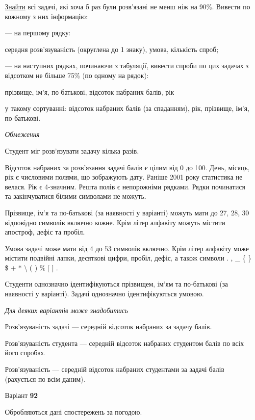 \documentclass[11pt, ukrainian]{article}
\begin{document}
\underline{Знайти} всі задачі, які хоча б раз були розв’язані не менш ніж на 90\%. Вивести по кожному з них інформацію:\par
{\noindent}--- на першому рядку:\par
середня розв’язуваність (округлена до 1 знаку), умова, кількість спроб;

{\noindent}--- на наступних рядках, починаючи з табуляції, вивести спроби по цих задачах з відсотком не більше 75\% (по одному на рядок):\par
прізвище, ім’я, по-батькові, відсоток набраних балів, рік

{\noindent}у такому сортуванні: відсоток набраних балів (за спаданням), рік, прізвище, ім’я, по-батькові.


\bigskip\textit{Обмеження}

Студент міг розв’язувати задачу кілька разів.

Відсоток набраних за розв’язання задачі балів є цілим від 0 до 100.
День, місяць, рік є числовими полями, що зображують дату.
Раніше 2001 року статистика не велася. Рік є 4-значним.
Решта полів є непорожніми рядками.
Рядки починатися та закінчуватися білими символами не можуть.

Прізвище, ім’я та по-батькові (за наявності у варіанті) можуть мати до 27, 28, 30 відповідно символів включно кожне. 
Крім літер алфавіту можуть містити апостроф, дефіс та пробіл.

Умова задачі може мати від 4 до 53 символів включно.
Крім літер алфавіту може містити подвійні лапки, десяткові цифри, пробіл, дефіс,
а також символи . , \_ \{ \} \$ $+$ $*$ {\textbackslash} ( ) \% $[$ $]$ .

Студенти однозначно ідентифікуються прізвищем, ім’ям та по-батькові (за наявності у варіанті).
Задачі однозначно ідентифікуються умовою.

\bigskip\textit{Для деяких варіантів може знадобитись}

Розв'язуваність задачі --- середній відсоток набраних за задачу балів.

Розв'язуваність студента --- середній відсоток набраних студентом балів по всіх його спробах.

Розв'язуваність --- середній відсоток набраних студентами за задачі балів (рахується по всім даним).




\par
\newpage
{\center Варіант  \No \textbf { 92 }\par}
\bigskip
Обробляються дані спостережень за погодою. 
\end{document}
